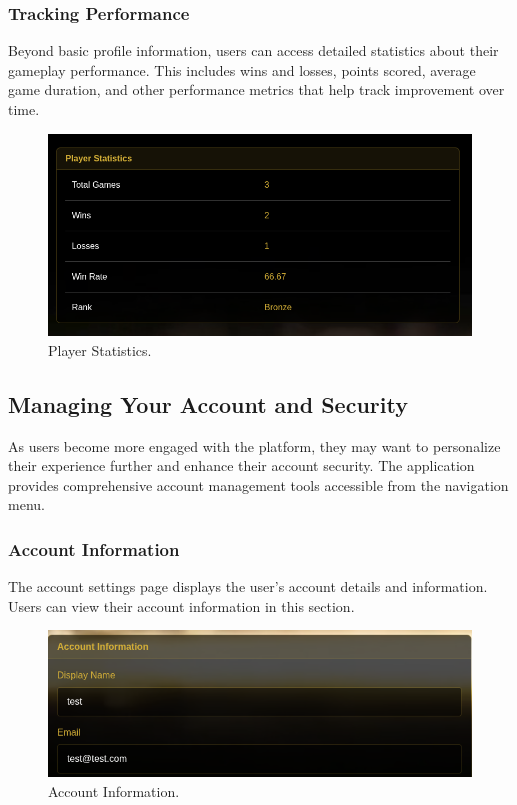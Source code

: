 \subsubsection{Tracking Performance} Beyond basic profile information, users can access detailed statistics about their gameplay performance. This includes wins and losses, points scored, average game duration, and other performance metrics that help track improvement over time.

\begin{figure}[H]
    \centering
    \includegraphics[width=0.65\linewidth]{Figures/images/new_images/PlayerStatisticsWithData.png}
    \caption{Player Statistics.} %
    \label{fig:player-stats-journey}
\end{figure}

\subsection{Managing Your Account and Security}

As users become more engaged with the platform, they may want to personalize their experience further and enhance their account security. The application provides comprehensive account management tools accessible from the navigation menu.

\subsubsection{Account Information} The account settings page displays the user's account details and information. Users can view their account information in this section.

\begin{figure}[H]
    \centering
    \includegraphics[width=0.65\linewidth]{Figures/images/new_images/AccountInformation.png} %
    \caption{Account Information.} %
    \label{fig:settings-journey}
\end{figure}


